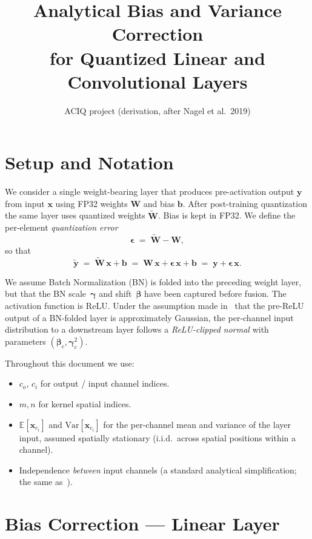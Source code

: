 \documentclass[11pt,a4paper]{article}
\title{Analytical Bias and Variance Correction\\for Quantized Linear and Convolutional Layers}
\author{ACIQ project (derivation, after Nagel et al.\ 2019)}
\date{}
\newcommand{\W}{\mathbf{W}}
\newcommand{\Wt}{\widetilde{\mathbf{W}}}
\newcommand{\xx}{\mathbf{x}}
\newcommand{\y}{\mathbf{y}}
\newcommand{\yt}{\widetilde{\mathbf{y}}}
\newcommand{\beps}{\boldsymbol{\epsilon}}
\newcommand{\bgam}{\boldsymbol{\gamma}}
\newcommand{\bbet}{\boldsymbol{\beta}}
\newcommand{\E}{\mathbb{E}}
\newcommand{\Var}{\mathrm{Var}}
\begin{document}
\maketitle

\section{Setup and Notation}

We consider a single weight-bearing layer that produces pre-activation output $\y$ from input $\xx$ using FP32 weights $\W$ and bias $\mathbf{b}$. After post-training quantization the same layer uses quantized weights $\Wt$. Bias is kept in FP32. We define the per-element \emph{quantization error}
\begin{equation}
\beps \;=\; \Wt - \W,
\end{equation}
so that
\begin{equation}
\yt \;=\; \Wt\,\xx + \mathbf{b} \;=\; \W\,\xx + \beps\,\xx + \mathbf{b} \;=\; \y + \beps\,\xx.
\label{eq:basic_decomposition}
\end{equation}

We assume Batch Normalization (BN) is folded into the preceding weight layer, but that the BN scale~$\bgam$ and shift~$\bbet$ have been captured before fusion. The activation function is ReLU. Under the assumption made in~\cite{nagel2019} that the pre-ReLU output of a BN-folded layer is approximately Gaussian, the per-channel input distribution to a downstream layer follows a \emph{ReLU-clipped normal} with parameters $(\bbet_c, \bgam_c^2)$.

Throughout this document we use:
\begin{itemize}
\item $c_o$, $c_i$ for output / input channel indices.
\item $m, n$ for kernel spatial indices.
\item $\E[\xx_{c_i}]$ and $\Var[\xx_{c_i}]$ for the per-channel mean and variance of the layer input, assumed spatially stationary (i.i.d.\ across spatial positions within a channel).
\item Independence \emph{between} input channels (a standard analytical simplification; the same as~\cite{nagel2019}).
\end{itemize}

\section{Bias Correction --- Linear Layer}
\label{sec:bias_linear}
\end{document}
